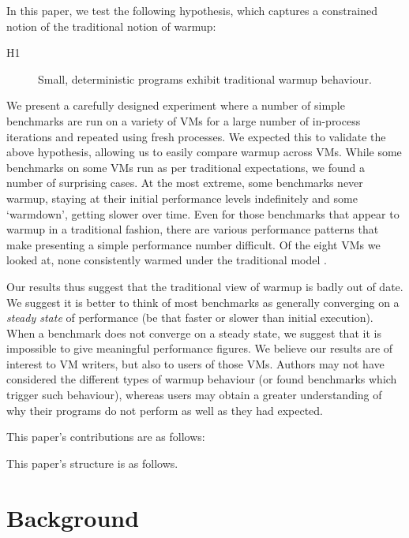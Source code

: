 \documentclass[10pt,preprint]{sigplanconf}
\newcommand{\hypone}{H1\xspace}
\begin{document}
In this paper, we test the following hypothesis, which captures a constrained
notion of the traditional notion of warmup:
\begin{description}
  \item[\hypone] Small, deterministic programs exhibit traditional warmup behaviour.
\end{description}

We present a carefully designed
experiment where a number of simple benchmarks are run on a variety of
VMs for a large number of in-process iterations and repeated using fresh
processes. We expected this to validate the above hypothesis, allowing us to
easily compare warmup across VMs. While some benchmarks on some VMs run as per
traditional expectations, we found a number of surprising cases. At
the most extreme, some benchmarks never warmup, staying at their initial performance
levels indefinitely and some `warmdown', getting slower over time. Even for
those benchmarks that appear to warmup in a traditional fashion, there are
various performance patterns that make presenting a simple performance number
difficult. Of the eight VMs we looked at,
none consistently warmed under the traditional model .

Our results thus suggest that the traditional view of warmup is badly out of date. 
We suggest it is better to think of most benchmarks as
generally converging on a \emph{steady state} of performance (be that faster or
slower than initial execution). When a benchmark does not converge on a steady
state, we suggest that it is impossible to give meaningful performance figures.
We believe our results are of interest to VM writers, but also to users of
those VMs. Authors may not have considered the different types of warmup
behaviour (or found benchmarks which trigger such behaviour), whereas users may
obtain a greater understanding of why their programs do not perform as well as
they had expected.

This paper's contributions are as follows:
\begin{enumerate*}
  \item {}
\end{enumerate*}

This paper's structure is as follows. 


\section{Background}
\label{sec:warmup}
\end{document}

